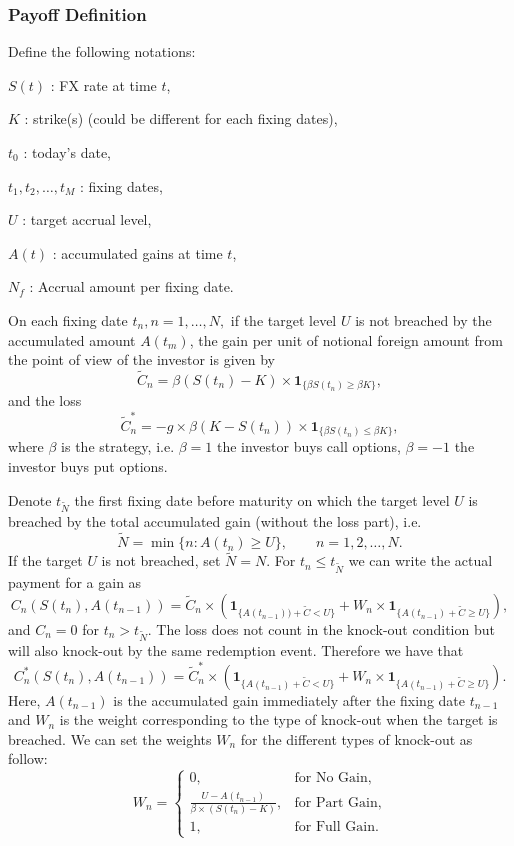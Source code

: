 \subsubsection*{Payoff Definition}
\label{sec:intro:Payoff}
Define the following notations:
\begin{my_list_item}
\item $S(t)$ : FX rate at time $t$,
\item $K$ : strike(s) (could be different for each fixing dates),
\item $t_0$ : today's date,
\item $t_1,t_2,\ldots,t_M$ : fixing dates,
\item $U$ : target accrual level,
\item $A(t)$ : accumulated gains at time $t$,
\item $N_f$ : Accrual amount per fixing date.
\end{my_list_item}

On each fixing date $t_n, n = 1,\ldots,N,$ if the target level $U$ is not breached by the accumulated amount $A(t_m)$, the gain per unit of notional foreign amount from the point of view of the investor is given by
\[\tilde{C}_n = \beta(S(t_n)-K)\times \mathbf{1}_{\{\beta S(t_n)\geq \beta K\}}, \]
and the loss
\[\tilde{C}_n^\ast = -g \times \beta(K-S(t_n))\times \mathbf{1}_{\{\beta S(t_n)\leq \beta K\}}, \]
where $\beta$ is the strategy, i.e. $\beta = 1$ the investor buys call options, $\beta = -1$ the investor buys put options.

Denote $t_{\tilde{N}}$ the first fixing date before maturity on which the target level $U$ is breached by the total accumulated gain (without the loss part), i.e.
\[\tilde{N}=\min\{n: A(t_n)\geq U\},\qquad n = 1,2,\ldots,N.\]
If the target $U$ is not breached, set $\tilde{N} = N$. For $t_n \leq t_{\tilde{N}}$ we can write the actual payment for a gain as
\begin{equation}\label{eq:TARN:gain}
C_n(S(t_n),A(t_{n-1})) = \tilde{C}_n\times \left(\mathbf{1}_{\{A(t_{n-1}))+\tilde{C}<U\}}+W_n\times\mathbf{1}_{\{A(t_{n-1})+\tilde{C}\geq U\}}\right),
\end{equation}
and $C_n=0$ for $t_n>t_{\tilde{N}}$. The loss does not count in the knock-out condition but will also knock-out by the same redemption event. Therefore we have that
\begin{equation}\label{eq:TARN:loss}
C^\ast_n(S(t_n),A(t_{n-1})) = \tilde{C}_n^\ast\times \left(\mathbf{1}_{\{A(t_{n-1})+\tilde{C}<U\}}+W_n\times\mathbf{1}_{\{A(t_{n-1})+\tilde{C}\geq U\}}\right).
\end{equation}
Here, $A(t_{n-1})$ is the accumulated gain immediately after the fixing date $t_{n-1}$ and $W_n$ is the weight corresponding to the type of knock-out when the target is breached. We can set the weights $W_n$ for the different types of knock-out as follow:
\[W_n = \begin{cases}
0, &\text{for No Gain,} \\
\frac{U-A(t_{n-1})}{\beta\times(S(t_n)-K)}, & \text{for Part Gain,}\\
1, &\text{for Full Gain.}
\end{cases}\]

